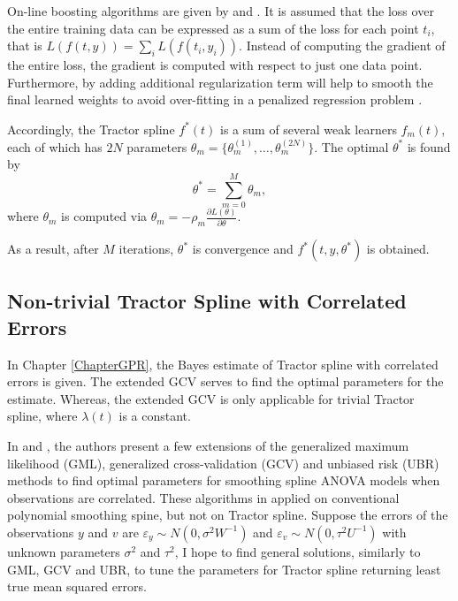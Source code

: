 On-line boosting algorithms are given by \cite{babenko2009family} and \cite{beygelzimer2015online}. It is assumed that the loss over the entire training data can be expressed as a sum of the loss for each point $t_i$, that is $L(f(t,y))=\sum_i L(f(t_i,y_i))$. Instead of computing the gradient of the entire loss, the gradient is computed with respect to just one data point. Furthermore, by adding additional regularization term will help to smooth the final learned weights to avoid over-fitting in a penalized regression problem \cite{chen2016xgboost}. 

Accordingly, the Tractor spline $f^*(t)$ is a sum of several weak learners $f_m(t)$, each of which has $2N$ parameters $\theta_m=\{\theta_m^{(1)},\ldots,\theta_m^{(2N)}\}$. The optimal $\theta^*$ is found by 
\begin{equation*}
\theta^*=\sum_{m=0}^{M}\theta_m,
\end{equation*}
where $\theta_m$ is computed via $\theta_m=-\rho_m\frac{\partial L(\theta)}{\partial \theta}$. 

As a result, after $M$ iterations, $\theta^*$ is convergence and $f^*(t,y,\theta^*)$ is obtained. 



\subsection*{Non-trivial Tractor Spline with Correlated Errors}

In Chapter \ref{ChapterGPR}, the Bayes estimate of Tractor spline with correlated errors is given. The extended GCV serves to find the optimal parameters for the estimate. Whereas, the extended GCV is only applicable for trivial Tractor spline, where $\lambda(t)$ is a constant. 


In \cite{opsomer2001nonparametric} and \cite{wang1998smoothing}, the authors present a few extensions of the generalized maximum likelihood (GML), generalized cross-validation (GCV) and unbiased risk (UBR) methods to find optimal parameters for smoothing spline ANOVA models when observations are correlated. These algorithms in applied on conventional polynomial smoothing spine, but not on Tractor spline. Suppose the errors of the observations $y$ and $v$ are $\varepsilon_y\sim N(0,\sigma^2W^{-1})$ and $\varepsilon_v\sim N(0,\tau^2U^{-1})$ with unknown parameters $\sigma^2$ and $\tau^2$, I hope to find general solutions, similarly to GML, GCV and UBR, to tune the parameters for Tractor spline returning least true mean squared errors. 




